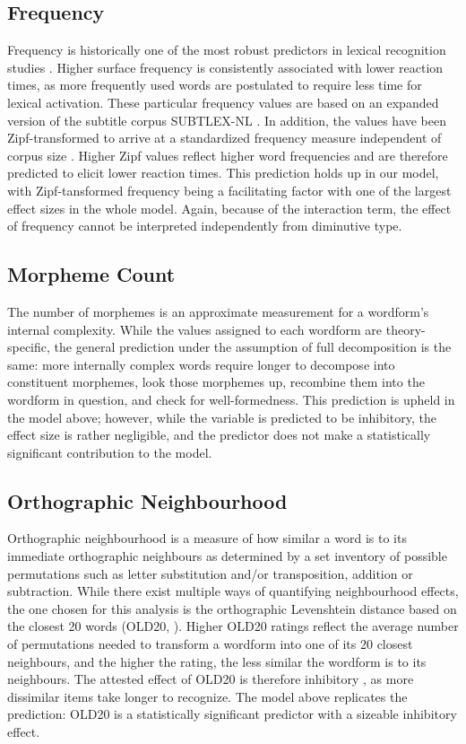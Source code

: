 \subsection{Frequency} \label{subsec:freq}
Frequency is historically one of the most robust predictors in lexical recognition studies \parencite{Brysbaert+etal+2016}. Higher surface frequency is consistently associated with lower reaction times, as more frequently used words are postulated to require less time for lexical activation. These particular frequency values are based on an expanded version of the subtitle corpus SUBTLEX-NL \parencite{Keuleers+etal+2010}. In addition, the values have been Zipf-transformed to arrive at a standardized frequency measure independent of corpus size \parencite{vanHeuven+etal+2014}. Higher Zipf values reflect higher word frequencies and are therefore predicted to elicit lower reaction times. This prediction holds up in our model, with Zipf-tansformed frequency being a facilitating factor with one of the largest effect sizes in the whole model. Again, because of the interaction term, the effect of frequency cannot be interpreted independently from diminutive type.
\subsection{Morpheme Count} \label{subsec:nmorph}
The number of morphemes is an approximate measurement for a wordform's internal complexity. While the values assigned to each wordform are theory-specific, the general prediction under the assumption of full decomposition is the same: more internally complex words require longer to decompose into constituent morphemes, look those morphemes up, recombine them into the wordform in question, and check for well-formedness. This prediction is upheld in the model above; however, while the variable is predicted to be inhibitory, the effect size is rather negligible, and the predictor does not make a statistically significant contribution to the model.
\subsection{Orthographic Neighbourhood} \label{subsec:old20}
Orthographic neighbourhood is a measure of how similar a word is to its immediate orthographic neighbours as determined by a set inventory of possible permutations such as letter substitution and/or transposition, addition or subtraction. While there exist multiple ways of quantifying neighbourhood effects, the one chosen for this analysis is the orthographic Levenshtein distance based on the closest 20 words (OLD20, \cite{Yarkoni+etal+2008}). Higher OLD20 ratings reflect the average number of permutations needed to transform a wordform into one of its 20 closest neighbours, and the higher the rating, the less similar the wordform is to its neighbours. The attested effect of OLD20 is therefore inhibitory \parencite[among others]{Brysbaert+etal+2016}, as more dissimilar items take longer to recognize. The model above replicates the prediction: OLD20 is a statistically significant predictor with a sizeable inhibitory effect.
